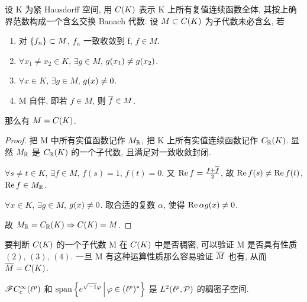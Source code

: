 \begin{theorem}
设 K 为紧 Hausdorff 空间, 用 $C\xk{K}$ 表示 K 上所有复值连续函数全体, 其按上确界范数构成一个含幺交换 Banach 代数. 设 $M\subset C\xk{K}$ 为子代数\lk 未必含幺\rk, 若
\begin{enumerate}[\rm(1)]
\item 对 $\left\{f_n\right\}\subset M$, $f_n$ 一致收敛到 f, $f\in M$.
\item $\forall x_1\neq x_2\in K$, $\exists g\in M$, $g\xk{x_1}\neq g\xk{x_2}$.
\item $\forall x\in K$, $\exists g\in M$, $g\xk{x}\neq 0$.
\item M 自伴, 即若 $f\in M$, 则 $\overline{f}\in M$.
\end{enumerate}
那么有 $M=C\xk{K}$.
\end{theorem}
\begin{proof}
把 M 中所有实值函数记作 $M_{\mathbb{R}}$, 把 K 上所有实值连续函数记作 $C_\rr\xk{K}$. 显然 $M_{\mathbb{R}}$ 是 $C_\rr\xk{K}$ 的一个子代数, 且满足对一致收敛封闭.\par 
$\forall s\neq t\in K$, $\exists f\in M$, $f(s)=1$, $f(t)=0$. 又 $\mathrm{Re}\, f=\frac{f+\overline{f}}{2}$, 故 $\re f\xk{s}\neq\re f\xk{t}$, $\mathrm{Re}\, f\in M_{\mathbb{R}}$.\par 
$\forall x\in K$, $\exists g\in M$, $g\xk{x}\neq 0$. 取合适的复数 $\alpha$, 使得 $\mathrm{Re}\, \alpha g(x)\neq 0$.\par 
故 $M_\rr=C_\rr\xk{K}\Rightarrow C\xk{K}=M$.
\end{proof}
\begin{remark}
要判断 $C\xk{K}$ 的一个子代数 M 在 $C\xk{K}$ 中是否稠密, 可以验证 M 是否具有性质 $(2),\,(3),\,(4)$. 一旦 M 有这种运算性质那么容易验证 $\overline{M}$ 也有, 从而 $\mean{M}=C\xk{K}$.
\end{remark}
\begin{proposition}
$\mathscr{F}C_c^\infty(\ell^p)$ 和 $\mathrm{span}\left\{e^{\sqrt{\smash{-}1}\varphi}\,\middle\vert\,\varphi\in(\ell^p)^*\right\}$ 是 $L^2(\ell^p,\mathcal{P})$ 的稠密子空间.
\end{proposition}
